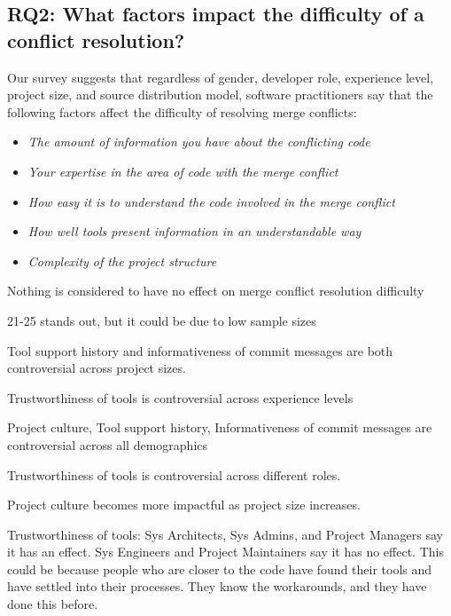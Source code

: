 \subsection{RQ2: What factors impact the difficulty of a conflict resolution?}\label{RQ2}


Our survey suggests that regardless of gender, developer role, experience level, project size, and source distribution model, software practitioners say that the following factors affect the difficulty of resolving merge conflicts: 
\begin{itemize}
\item \textit{The amount of information you have about the conflicting code}\\
\item \textit{Your expertise in the area of code with the merge conflict}\\
\item \textit{How easy it is to understand the code involved in the merge conflict}\\
\item \textit{How well tools present information in an understandable way}
\item \textit{Complexity of the project structure}
\end{itemize}

Nothing is considered to have no effect on merge conflict resolution difficulty

21-25 stands out, but it could be due to low sample sizes

Tool support history and informativeness of commit messages are both controversial across project sizes.

Trustworthiness of tools is controversial across experience levels

Project culture, Tool support history, Informativeness of commit messages are controversial across all demographics

Trustworthiness of tools is controversial across different roles.

Project culture becomes more impactful as project size increases.

Trustworthiness of tools: Sys Architects, Sys Admins, and Project Managers say it has an effect. Sys Engineers and Project Maintainers say it has no effect. This could be because people who are closer to the code have found their tools and have settled into their processes. They know the workarounds, and they have done this before.

